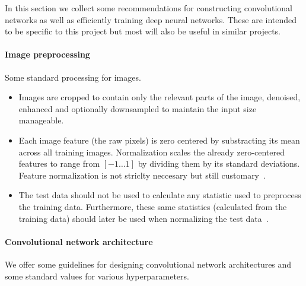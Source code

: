 In this section we collect some recommendations for constructing convolutional networks as well as efficiently training deep neural networks. These are intended to be specific to this project but most will also be useful in similar projects.


\paragraph{Image preprocessing} Some standard processing for images.
\begin{itemize}
	\item Images are cropped to contain only the relevant parts of the image, denoised, enhanced and optionally downsampled to maintain the input size manageable.

	\item Each image feature (the raw pixels) is zero centered by substracting its mean across all training images. Normalization scales the already zero-centered features to range from $[-1 \dots 1]$ by dividing them by its standard deviations. Feature normalization is not striclty neccesary but still customary~\cite{Karpathy2015}.

	\item The test data should not be used to calculate any statistic used to preprocess the training data. Furthermore, these same statistics (calculated from the training data) should later be used when normalizing the test data~\cite{Karpathy2015}.
\end{itemize}

\paragraph{Convolutional network architecture}
We offer some guidelines for designing convolutional network architectures and some standard values for various hyperparameters.


